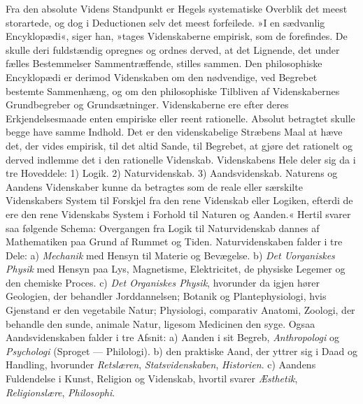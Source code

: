 \documentclass[12pt]{book}
\newcommand{\apage}[1]{\marginnote{\footnotesize\textit{[#1]}}}
\begin{document}
Fra den absolute Videns Standpunkt er Hegels systematiske Overblik det
meest storartede, og dog i Deductionen selv det meest forfeilede. »I en
sædvanlig Encyklopædi«, siger han, »tages Videnskaberne empirisk, som de
forefindes. De skulle deri fuldstændig \apage{87} opregnes og ordnes derved, at det
Lignende, det under fælles Bestemmelser Sammentræffende, stilles sammen.
Den philosophiske Encyklopædi er derimod Videnskaben om den nødvendige, ved
Begrebet bestemte Sammenhæng, og om den philosophiske Tilbliven af
Videnskabernes Grundbegreber og Grundsætninger. Videnskaberne ere efter
deres Erkjendelsesmaade enten empiriske eller reent rationelle. Absolut
betragtet skulle begge have samme Indhold. Det er den videnskabelige
Stræbens Maal at hæve det, der vides empirisk, til det altid Sande, til
Begrebet, at gjøre det rationelt og derved indlemme det i den rationelle
Videnskab. Videnskabens Hele deler sig da i tre Hoveddele: 1) Logik. 2)
Naturvidenskab. 3) Aandsvidenskab. Naturens og Aandens Videnskaber kunne
da betragtes som de reale eller særskilte Videnskabers System til Forskjel
fra den rene Videnskab eller Logiken, efterdi de ere den rene Videnskabs
System i Forhold til Naturen og Aanden.« Hertil svarer saa følgende Schema:
Overgangen fra Logik til Naturvidenskab dannes af Mathematiken paa Grund af
Rummet og Tiden. Naturvidenskaben falder i tre Dele: a) \emph{Mechanik} med
Hensyn til Materie og Bevægelse. b) \emph{Det Uorganiskes Physik} med Hensyn paa
Lys, Magnetisme, Elektricitet, de physiske Legemer og den chemiske Proces.
c) \emph{Det Organiskes Physik}, hvorunder da igjen hører Geologien, der behandler
Jorddannelsen; Botanik og Plantephysiologi, hvis Gjenstand er den vegetabile
Natur; Physiologi, comparativ Anatomi, Zoologi, der behandle den sunde,
animale Natur, ligesom Medicinen \apage{88} den syge. Ogsaa Aandsvidenskaben falder i
tre Afsnit: a) Aanden i sit Begreb, \emph{Anthropologi} og \emph{Psychologi} (Sproget --- Philologi). b) den praktiske Aand, der yttrer sig i Daad og Handling,
hvorunder \emph{Retslæren}, \emph{Statsvidenskaben}, \emph{Historien}. c) Aandens Fuldendelse i
Kunst, Religion og Videnskab, hvortil svarer \emph{Æsthetik}, \emph{Religionslære},
\emph{Philosophi}.
\end{document}

